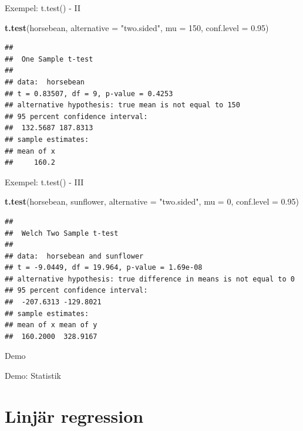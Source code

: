 \documentclass[
  11pt,
  ignorenonframetext,
  handout]{beamer}
\newenvironment{Shaded}{\begin{snugshade}}{\end{snugshade}}
\newcommand{\AttributeTok}[1]{\textcolor[rgb]{0.13,0.29,0.53}{#1}}
\newcommand{\DecValTok}[1]{\textcolor[rgb]{0.00,0.00,0.81}{#1}}
\newcommand{\FloatTok}[1]{\textcolor[rgb]{0.00,0.00,0.81}{#1}}
\newcommand{\FunctionTok}[1]{\textcolor[rgb]{0.13,0.29,0.53}{\textbf{#1}}}
\newcommand{\NormalTok}[1]{#1}
\newcommand{\StringTok}[1]{\textcolor[rgb]{0.31,0.60,0.02}{#1}}
\begin{document}
\begin{frame}[fragile]{Exempel: t.test() - II}
\label{exempel-t.test---ii}
\begin{Shaded}
\begin{Highlighting}[]
\FunctionTok{t.test}\NormalTok{(horsebean, }\AttributeTok{alternative =} \StringTok{"two.sided"}\NormalTok{,}
       \AttributeTok{mu =} \DecValTok{150}\NormalTok{, }\AttributeTok{conf.level =} \FloatTok{0.95}\NormalTok{)}
\end{Highlighting}
\end{Shaded}

\begin{verbatim}
## 
##  One Sample t-test
## 
## data:  horsebean
## t = 0.83507, df = 9, p-value = 0.4253
## alternative hypothesis: true mean is not equal to 150
## 95 percent confidence interval:
##  132.5687 187.8313
## sample estimates:
## mean of x 
##     160.2
\end{verbatim}
\end{frame}

\begin{frame}[fragile]{Exempel: t.test() - III}
\label{exempel-t.test---iii}
\begin{Shaded}
\begin{Highlighting}[]
\FunctionTok{t.test}\NormalTok{(horsebean, sunflower,}
       \AttributeTok{alternative =} \StringTok{"two.sided"}\NormalTok{,}
       \AttributeTok{mu =} \DecValTok{0}\NormalTok{, }\AttributeTok{conf.level =} \FloatTok{0.95}\NormalTok{)}
\end{Highlighting}
\end{Shaded}

\begin{verbatim}
## 
##  Welch Two Sample t-test
## 
## data:  horsebean and sunflower
## t = -9.0449, df = 19.964, p-value = 1.69e-08
## alternative hypothesis: true difference in means is not equal to 0
## 95 percent confidence interval:
##  -207.6313 -129.8021
## sample estimates:
## mean of x mean of y 
##  160.2000  328.9167
\end{verbatim}
\end{frame}

\begin{frame}{Demo}
\label{demo-1}
\begin{block}{Demo: Statistik}
\label{demo-statistik}
\end{block}
\end{frame}

\section{Linjär regression}\label{linjuxe4r-regression}
\end{document}
